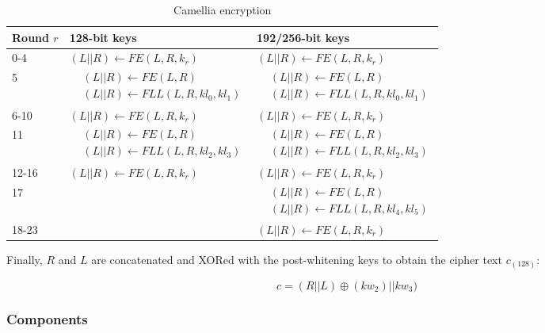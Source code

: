 \begin{table}[h!]
    \centering
    \caption{Camellia encryption}
    \begin{tabular}{lll}
        \toprule
        Round $r$ & 128-bit keys & 192/256-bit keys \\
        \midrule
        0-4 & $(L||R)\leftarrow FE(L,R,k_r)$ & $(L||R)\leftarrow FE(L,R,k_r)$ \\
        \midrule
        5 & {$\!\begin{aligned}&(L||R)\leftarrow FE(L,R)\\&(L||R)\leftarrow FLL(L,R,kl_0,kl_1)\end{aligned}$} & {$\!\begin{aligned}&(L||R)\leftarrow FE(L,R)\\&(L||R)\leftarrow FLL(L,R,kl_0,kl_1)\end{aligned}$} \\
        \midrule
        6-10 & $(L||R)\leftarrow FE(L,R,k_r)$ & $(L||R)\leftarrow FE(L,R,k_r)$ \\
        \midrule
        11 & {$\!\begin{aligned}&(L||R)\leftarrow FE(L,R)\\&(L||R)\leftarrow FLL(L,R,kl_2,kl_3)\end{aligned}$} & {$\!\begin{aligned}&(L||R)\leftarrow FE(L,R)\\&(L||R)\leftarrow FLL(L,R,kl_2,kl_3)\end{aligned}$} \\
        \midrule
        12-16 & $(L||R)\leftarrow FE(L,R,k_r)$ & $(L||R)\leftarrow FE(L,R,k_r)$ \\
        \midrule
        17 & & {$\!\begin{aligned}&(L||R)\leftarrow FE(L,R)\\&(L||R)\leftarrow FLL(L,R,kl_4,kl_5)\end{aligned}$} \\
        \midrule
        18-23 & & $(L||R)\leftarrow FE(L,R,k_r)$ \\
        \bottomrule
    \end{tabular}
\end{table}

Finally, $R$ and $L$ are concatenated and XORed with the post-whitening keys to
obtain the cipher text $c_{(128)}$:

\[
    c=(R||L)\oplus (kw_2)||kw_3)
\]

\subsubsection{Components}


